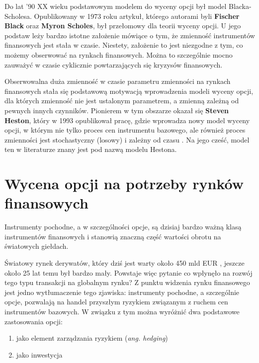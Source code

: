 \documentclass{pracamgr}
\begin{document}
Do lat '90 XX wieku podstawowym modelem do wyceny opcji był model Blacka-Scholesa. Opublikowany w 1973  \cite{BlackScholes} roku artykuł, którego autorami byli \textbf{Fischer Black} oraz \textbf{Myron Scholes},
był przełomowy dla teorii wyceny opcji.
U jego podstaw leży bardzo istotne założenie mówiące o tym, że zmienność instrumentów finansowych jest stała w czasie. 
Niestety, założenie to jest niezgodne z tym, co możemy obserwować na rynkach finansowych. 
Można to szczególnie mocno zauważyć w czasie cyklicznie powtarzających się kryzysów finansowych.

Obserwowalna duża zmienność w czasie parametru zmienności na rynkach finansowych stała się podstawową motywacją wprowadzenia modeli wyceny
opcji, dla których zmienność nie jest ustalonym parametrem, a zmienną zależną od pewnych innych czynników. 
Pionierem w tym obszarze okazał się \textbf{Steven Heston}, który w 1993 opublikował pracę, gdzie wprowadza
nowy model wyceny opcji, w którym nie tylko proces cen instrumentu bazowego, ale również
proces zmienności jest stochastyczny (losowy) i zależny od czasu  \cite{Heston}. Na jego cześć, model ten 
w literaturze znany jest pod nazwą modelu Hestona.
 

\section{Wycena opcji na potrzeby rynków finansowych} %

Instrumenty pochodne, a w szczególności opcje, są dzisiaj bardzo ważną klasą instrumentów finansowych i stanowią znaczną 
część wartości obrotu na światowych giełdach.

Światowy rynek derywatów, który dziś jest warty około 450 mld EUR  \cite{GlobalDerMarket}, jeszcze około 25 lat temu był bardzo mały. Powstaje więc pytanie co wpłynęło na rozwój tego typu transakcji na globalnym rynku? Z punktu widzenia rynku finansowego jest jedno wytłumaczenie tego zjawiska:
instrumenty pochodne, a szczególnie opcje, pozwalają na handel przyszłym ryzykiem związanym z ruchem cen instrumentów bazowych. W związku z tym można wyróżnić dwa podstawowe 
zastosowania opcji: 

\begin{enumerate}
  \item jako element zarządzania ryzykiem (\textit{ang. hedging})
  \item jako inwestycja 
\end{enumerate}
\end{document}
